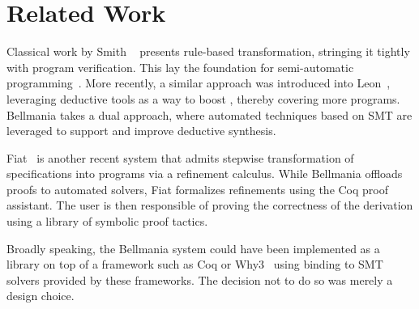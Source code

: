 \section{Related Work}
\label{related}

Classical work by Smith \etal~\cite{AI85/Smith} presents rule-based transformation, stringing it
tightly with program verification. This lay the foundation for semi-automatic programming~\cite{CPS91/Blaine,TSE90/Smith,TPHOLs96/Butler}.
More recently, a similar approach was introduced into Leon~\cite{OOPSLA13/Kneuss}, leveraging deductive
tools as a way to boost {\cegis}, thereby covering more programs. Bellmania takes a dual approach, where
automated techniques based on SMT are leveraged to support and improve deductive synthesis.

Fiat~\cite{POPL15/Delaware} is another recent system that admits stepwise transformation of specifications
into programs via a refinement calculus. While Bellmania offloads proofs to automated solvers,
Fiat formalizes refinements using the Coq proof assistant. The user is then responsible of proving
the correctness of the derivation using a library of symbolic proof tactics.

Broadly speaking, the Bellmania system could have been implemented as a library on top of a framework
such as Coq or Why3~\cite{ESOP13/Filliatre} using binding to SMT solvers provided by these frameworks.
The decision not to do so was merely a design choice.

\begin{comment}
Our ``$\big/$'' operator can be compared to the separating disjunction ``$\ast$'' of Separation Logic~\cite{LICS02/Reynolds},
used to frame parts of the dynamic heap (which can be thought of as one large array),
in particular while checking that a program only accesses the parts allocated to it in its precondition.
While $\ast$ has the semantics of an existentially quantified predicate, Bellmania uses type qualifiers
to explicitly specify a formula defining each part. In this sense, it is more closely related to
Region Logic~\cite{ECOOP08/Banerjee}. These formulas make encoding in first-order logic straightforward,
and the use of Liquid Types allows for any number of dimensions and for decidable checking of domain inclusion
and disjointness.
\end{comment}
